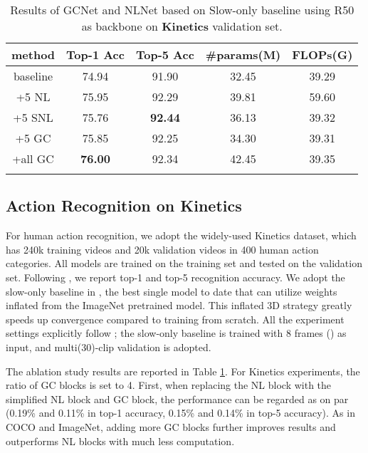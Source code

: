 \documentclass[10pt,twocolumn,letterpaper]{article}
\begin{document}
\begin{table}[]
    \footnotesize
    \centering
    \addtolength{\tabcolsep}{-2.5pt}
\begin{tabular}{c|cc|c|c}
\Xhline{1.0pt}
method & Top-1 Acc & Top-5 Acc & \#params(M) & FLOPs(G)\\
\hline
baseline & 74.94 & 91.90 & 32.45 & 39.29 \\
\hline
+5 NL    & 75.95 & 92.29 & 39.81 & 59.60 \\
+5 SNL   & 75.76 & \textbf{92.44} & 36.13 & 39.32 \\
+5 GC    & 75.85 & 92.25 & 34.30 & 39.31\\
+all GC  & \textbf{76.00} & 92.34 & 42.45 & 39.35\\
\Xhline{1.0pt}
\end{tabular}
	\vspace{-8pt}
    \caption{Results of GCNet and NLNet based on Slow-only baseline using R50 as backbone on \textbf{Kinetics} validation set.}
	\label{table:ablation-kinetics}
	\vspace{-10pt}
\end{table}


\subsection{Action Recognition on Kinetics}
For human action recognition, we adopt the widely-used Kinetics \cite{kay2017kinetics} dataset, which has 240k training videos and 20k validation videos in 400 human action categories. 
All models are trained on the training set and tested on the validation set. 
Following \cite{wang2017non}, we report top-1 and top-5 recognition accuracy.
We adopt the slow-only baseline in \cite{feichtenhofer2018slowfast}, the best single model to date that can utilize weights inflated \cite{carreira2017i3d} from the ImageNet pretrained model.
This inflated 3D strategy \cite{wang2017non} greatly speeds up convergence compared to training from scratch. 
All the experiment settings explicitly follow \cite{feichtenhofer2018slowfast}; the slow-only baseline is trained with 8 frames () as input, and multi(30)-clip validation is adopted.

The ablation study results are reported in Table \ref{table:ablation-kinetics}. 
For Kinetics experiments, the ratio of GC blocks is set to 4. 
First, when replacing the NL block with the simplified NL block and GC block, the performance can be regarded as on par (0.19\% and 0.11\% in top-1 accuracy, 0.15\% and 0.14\% in top-5 accuracy). 
As in COCO and ImageNet, adding more GC blocks further improves results and outperforms NL blocks with much less computation.
\end{document}
